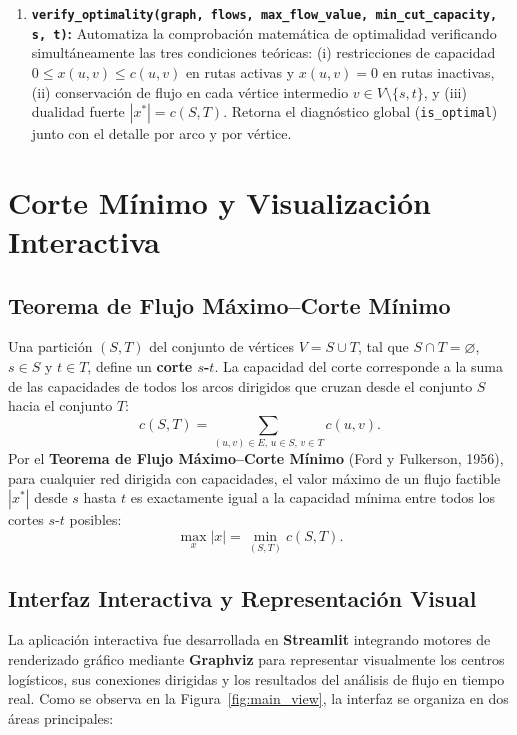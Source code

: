\documentclass[11pt,a4paper]{article}
\begin{document}
\begin{enumerate}
    \item \textbf{\texttt{verify\_optimality(graph, flows, max\_flow\_value, min\_cut\_capacity, s, t)}:} Automatiza la comprobación matemática de optimalidad verificando simultáneamente las tres condiciones teóricas: (i) restricciones de capacidad $0 \le x(u, v) \le c(u, v)$ en rutas activas y $x(u, v) = 0$ en rutas inactivas, (ii) conservación de flujo en cada vértice intermedio $v \in V \setminus \{s, t\}$, y (iii) dualidad fuerte $|x^*| = c(S, T)$. Retorna el diagnóstico global (\texttt{is\_optimal}) junto con el detalle por arco y por vértice.
\end{enumerate}

\section{Corte Mínimo y Visualización Interactiva}

\subsection{Teorema de Flujo Máximo--Corte Mínimo}
Una partición $(S, T)$ del conjunto de vértices $V = S \cup T$, tal que $S \cap T = \varnothing$, $s \in S$ y $t \in T$, define un \textbf{corte $s$-$t$}. La capacidad del corte corresponde a la suma de las capacidades de todos los arcos dirigidos que cruzan desde el conjunto $S$ hacia el conjunto $T$:
\[
    c(S, T) = \sum_{(u,v) \in E, \, u \in S,\, v \in T} c(u, v).
\]
Por el \textbf{Teorema de Flujo Máximo--Corte Mínimo} (Ford y Fulkerson, 1956), para cualquier red dirigida con capacidades, el valor máximo de un flujo factible $|x^*|$ desde $s$ hasta $t$ es exactamente igual a la capacidad mínima entre todos los cortes $s$-$t$ posibles:
\[
    \max_{x} |x| = \min_{(S, T)} c(S, T).
\]

\subsection{Interfaz Interactiva y Representación Visual}
La aplicación interactiva fue desarrollada en \textbf{Streamlit} integrando motores de renderizado gráfico mediante \textbf{Graphviz} para representar visualmente los centros logísticos, sus conexiones dirigidas y los resultados del análisis de flujo en tiempo real. Como se observa en la Figura~\ref{fig:main_view}, la interfaz se organiza en dos áreas principales:
\end{document}

